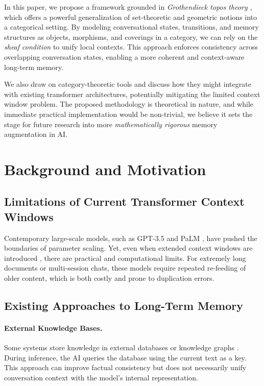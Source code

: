 \documentclass{article}
\begin{document}
In this paper, we propose a framework grounded in \emph{Grothendieck topos theory} \citep{grothendieck1972}, which offers a powerful generalization of set-theoretic and geometric notions into a categorical setting. By modeling conversational states, transitions, and memory structures as objects, morphisms, and coverings in a category, we can rely on the \emph{sheaf condition} to unify local contexts. This approach enforces consistency across overlapping conversation states, enabling a more coherent and context-aware long-term memory. 

We also draw on category-theoretic tools and discuss how they might integrate with existing transformer architectures, potentially mitigating the limited context window problem. The proposed methodology is theoretical in nature, and while immediate practical implementation would be non-trivial, we believe it sets the stage for future research into more \emph{mathematically rigorous} memory augmentation in AI.

\section{Background and Motivation}
\label{sec:background}

\subsection{Limitations of Current Transformer Context Windows}

Contemporary large-scale models, such as GPT-3.5 \citep{brown2020language} and PaLM \citep{chowdhery2022palm}, have pushed the boundaries of parameter scaling. Yet, even when extended context windows are introduced \citep{rae2023scaling}, there are practical and computational limits. For extremely long documents or multi-session chats, these models require repeated re-feeding of older content, which is both costly and prone to duplication errors.

\subsection{Existing Approaches to Long-Term Memory}
\label{subsec:existing_memory_approaches}

\paragraph{External Knowledge Bases.}
Some systems store knowledge in external databases or knowledge graphs \citep{bauer2021introducing}. During inference, the AI queries the database using the current text as a key. This approach can improve factual consistency but does not necessarily unify conversation context with the model's internal representation.
\end{document}

